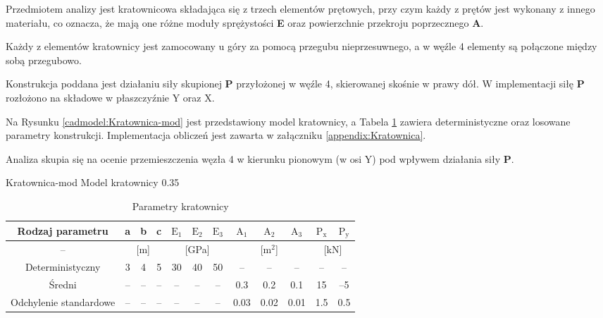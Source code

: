 Przedmiotem analizy jest kratownicowa składająca się z trzech elementów prętowych, przy czym każdy z prętów jest wykonany
z innego materiału, co oznacza, że mają one różne moduły sprężystości \textbf{E} oraz powierzchnie przekroju poprzecznego \textbf{A}.

Każdy z elementów kratownicy jest zamocowany u góry za pomocą przegubu nieprzesuwnego, a w węźle 4 elementy są połączone między sobą przegubowo.

Konstrukcja poddana jest działaniu siły skupionej \textbf{P} przyłożonej w węźle 4, skierowanej skośnie w prawy dół.
W implementacji siłę \textbf{P} rozłożono na składowe w płaszczyźnie Y oraz X.

Na Rysunku \ref{cadmodel:Kratownica-mod} jest przedstawiony model kratownicy, a Tabela \ref{tab:parametry-kratownica} zawiera deterministyczne oraz losowane parametry konstrukcji.
Implementacja obliczeń jest zawarta w załączniku \ref{appendix:Kratownica}.

Analiza skupia się na ocenie przemieszczenia węzła 4 w kierunku pionowym (w osi Y) pod wpływem działania siły \textbf{P}.

\cadmodel
{Kratownica-mod}
{Model kratownicy}
{0.35}

\begin{table}[H]
    \centering
    \begin{tabular}{|c|c|c|c|c|c|c|c|c|c|c|c|}
        \hline
        Rodzaj parametru & a & b & c & $\mathrm{E}_\mathrm{1}$ & $\mathrm{E}_\mathrm{2}$ & $\mathrm{E}_\mathrm{3}$ & $\mathrm{A}_\mathrm{1}$ & $\mathrm{A}_\mathrm{2}$ & $\mathrm{A}_\mathrm{3}$ & $\mathrm{P}_\mathrm{x}$ & $\mathrm{P}_\mathrm{y}$ \\
        \hline
        – & \multicolumn{3}{|c|}{[m]} & \multicolumn{3}{|c|}{[GPa]} & \multicolumn{3}{|c|}{[$\mathrm{m}^\mathrm{2}$]} & \multicolumn{2}{|c|}{[kN]} \\
        \hline
        Deterministyczny & 3 & 4 & 5 & 30 & 40 & 50 & – & – & – & – & – \\
        \hline
        Średni & – & – & – & – & – & – & 0.3 & 0.2 & 0.1 & 15 & –5 \\
        \hline
        Odchylenie standardowe & – & – & – & – & – & – & 0.03 & 0.02 & 0.01 & 1.5 & 0.5 \\
        \hline
    \end{tabular}
    \caption{Parametry kratownicy}
    \label{tab:parametry-kratownica}
\end{table}

